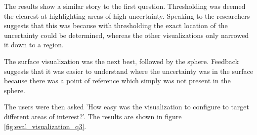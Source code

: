 The results show a similar story to the first question. Thresholding was deemed the clearest at highlighting areas of high uncertainty. Speaking to the researchers suggests that this was because with thresholding the exact location of the uncertainty could be determined, whereas the other visualizations only narrowed it down to a region.

The surface visualization was the next best, followed by the sphere. Feedback suggests that it was easier to understand where the uncertainty was in the surface because there was a point of reference which simply was not present in the sphere.

The users were then asked 'How easy was the visualization to configure to target different areas of interest?'. The results are shown in figure \ref{fig:eval_visualization_q3}.

